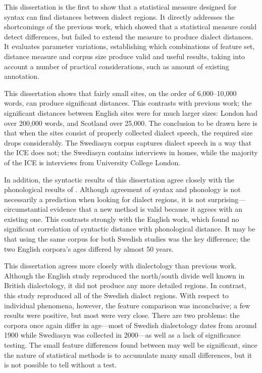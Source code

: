 This dissertation is the first to show that a statistical measure
designed for syntax can find distances between dialect regions. It
directly addresses the shortcomings of the previous work, which showed
that a statistical measure could detect differences, but failed to
extend the measure to produce dialect distances. It evaluates
parameter variations, establishing which combinations of feature set,
distance measure and corpus size produce valid and useful results,
taking into account a number of practical considerations, such as
amount of existing annotation.

This dissertation shows that fairly small sites, on the order of
6,000--10,000 words, can produce significant distances. This
contrasts with previous work; the significant distances between
English sites were for much larger sizes: London had over
200,000 words, and Scotland over 25,000. The conclusion to be drawn
here is that when the sites consist of properly collected dialect
speech, the required size drops considerably. The Swediasyn corpus
captures dialect speech in a way that the ICE does not; the Swediasyn
contains interviews in homes, while the majority of the ICE is
interviews from University College London.

In addition, the syntactic results of this dissertation agree closely
with the phonological results of . Although
agreement of syntax and phonology is not necessarily a prediction when
looking for dialect regions, it is not surprising---circumstantial
evidence that a new method is valid because it agrees with an existing
one. This contrasts strongly with the English work, which found no
significant correlation of syntactic distance with phonological
distance. It may be that using the same corpus for both Swedish
studies was the key difference; the two English corpora's ages differed by
almost 50 years.

This dissertation agrees more closely with dialectology than previous
work. Although the English study reproduced the north/south divide
well known in British dialectology, it did not produce any more
detailed regions. In contrast, this study reproduced all of the
Swedish dialect regions. With respect to individual phenomena,
however, the feature comparison was inconclusive; a few results were
positive, but most were very close. There are two problems: the
corpora once again differ in age---most of Swedish dialectology dates
from around 1900 while Swediasyn was collected in 2000---as well as a
lack of significance testing. The small feature differences found
between may well be significant, since the nature of statistical
methods is to accumulate many small differences, but it is not
possible to tell without a test.

